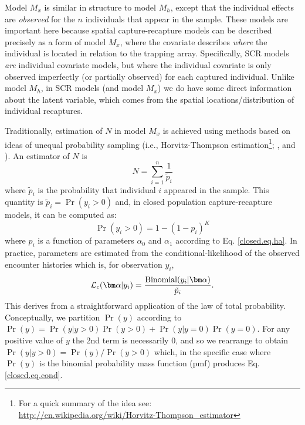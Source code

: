Model $M_{x}$ is similar in structure to model
$M_{h}$, except that the individual effects are {\it observed} for the
$n$ individuals that appear in the sample. These models are important
here because spatial capture-recapture models can be described
precisely as a form of model $M_{x}$, where the covariate
describes {\it where} the individual is located in relation to the
trapping array.  Specifically, SCR models {\it are} individual
covariate models, but where the
individual covariate is only observed imperfectly (or partially
observed) for each 
captured individual.  Unlike model $M_h$, in SCR models (and model
$M_{x}$) 
we do have some direct information about the
latent variable, which comes from the spatial locations/distribution
of individual recaptures.

Traditionally, estimation of $N$ in model $M_{x}$ is
achieved using methods based on ideas of unequal probability sampling
(i.e., Horvitz-Thompson estimation\footnote{For a  quick summary of
  the idea see: \\
  \url{http://en.wikipedia.org/wiki/Horvitz-Thompson_estimator}};
\citet{huggins:1989},
\citet{alho:1990} and \citet{borchers_etal:2002}). An estimator of $N$ is
\[
\hat{N} = \sum_{i=1}^{n} \frac{1}{\tilde{p}_{i}}
\]
where $\tilde{p}_{i}$ is the probability that individual $i$ appeared
in the sample.  
This quantity is $\tilde{p}_{i} = \Pr(y_{i}>0)$ and, 
in closed population capture-recapture models, it can be computed as:
\[
\Pr(y_{i}>0) = 1- (1-p_{i})^K
\]
where $p_{i}$ is a function of parameters $\alpha_{0}$ and $\alpha_{1}$
according to Eq. \ref{closed.eq.ha}.  In practice, parameters are
estimated from the conditional-likelihood of the observed encounter
histories which is, for observation $y_{i}$,
\begin{equation}
{\cal L}_{c}( {\bm \alpha} | y_{i}) = \frac{ \mbox{Binomial}(y_{i}|{\bm \alpha}) } { \tilde{p}_{i}}.
\label{closed.eq.cond}
\end{equation}
This derives from a straightforward application of the law of total
probability. Conceptually, we partition $\Pr(y)$ according to
$\Pr(y) = \Pr(y|y>0)\Pr(y>0) + \Pr(y|y=0)\Pr(y=0)$. For any positive
value of $y$ the 2nd term is necessarily 0, and so we rearrange to
obtain
$\Pr(y|y>0) = \Pr(y)/\Pr(y>0)$ which, in the specific case where
$\Pr(y)$ is the
binomial probability mass function (pmf) produces Eq. \ref{closed.eq.cond}.


